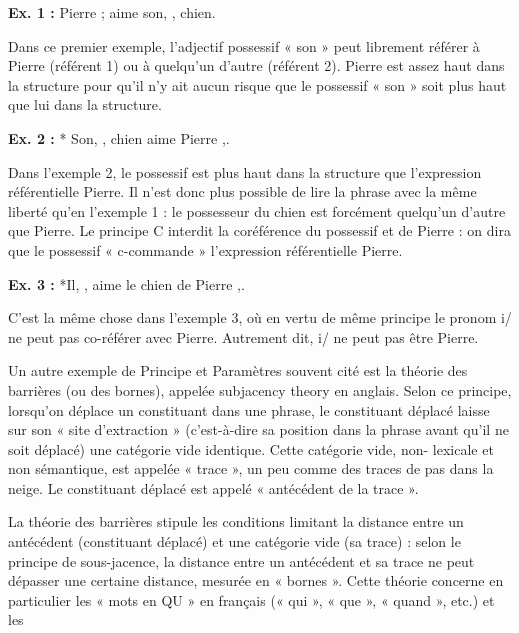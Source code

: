 \noindent\textbf{Ex. 1 :} Pierre ; aime son, , chien.\par

Dans ce premier exemple, l’adjectif possessif « son » peut librement référer à Pierre (référent 1) ou à quelqu’un d’autre (référent 2). Pierre est assez haut dans la structure pour qu’il n’y ait aucun risque que le possessif « son » soit plus haut que lui dans la structure.\par

\noindent\textbf{Ex. 2 :} * Son, , chien aime Pierre ,.\par

Dans l’exemple 2, le possessif est plus haut dans la structure que l’expression référentielle Pierre. Il n’est donc plus possible de lire la phrase avec la même liberté qu’en l’exemple 1 : le possesseur du chien est forcément quelqu’un d’autre que Pierre. Le principe C interdit la coréférence du possessif et de Pierre : on dira que le possessif « c-commande » l’expression référentielle Pierre.\par


\noindent\textbf{Ex. 3 :} *Il, , aime le chien de Pierre ,.\par

C’est la même chose dans l’exemple 3, où en vertu de même principe le pronom i/ ne peut pas co-référer avec Pierre. Autrement dit, i/ ne peut pas être Pierre.\par

Un autre exemple de Principe et Paramètres souvent cité est la théorie des barrières (ou des bornes), appelée subjacency theory en anglais. Selon ce principe, lorsqu’on déplace un constituant dans une phrase, le constituant déplacé laisse sur son « site d’extraction » (c’est-à-dire sa position dans la phrase avant qu’il ne soit déplacé) une catégorie vide identique. Cette catégorie vide, non- lexicale et non sémantique, est appelée « trace », un peu comme des traces de pas dans la neige. Le constituant déplacé est appelé « antécédent de la trace ».\par

La théorie des barrières stipule les conditions limitant la distance entre un antécédent (constituant déplacé) et une catégorie vide (sa trace) : selon le principe de sous-jacence, la distance entre un antécédent et sa trace ne peut dépasser une certaine distance, mesurée en « bornes ». Cette théorie concerne en particulier les « mots en QU » en français (« qui », « que », « quand », etc.) et les\par

